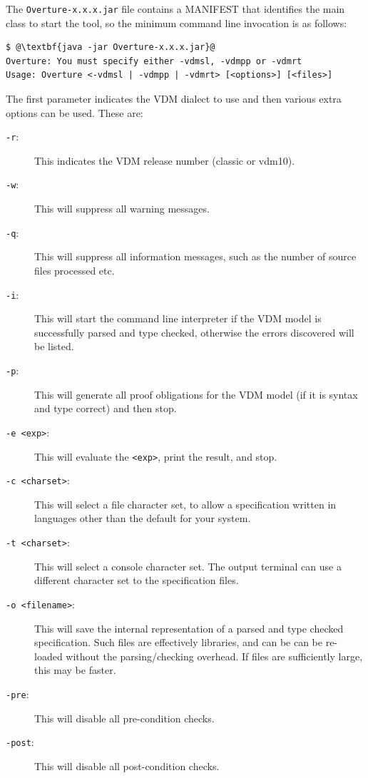 \documentclass{overturerepchap}
\begin{document}
The \texttt{Overture-x.x.x.jar} file contains a MANIFEST that identifies the main class to start the
tool, so the minimum command line invocation is as follows:

\lstset{style=tool,language=}
\begin{lstlisting}[escapechar=@]
$ @\textbf{java -jar Overture-x.x.x.jar}@
Overture: You must specify either -vdmsl, -vdmpp or -vdmrt
Usage: Overture <-vdmsl | -vdmpp | -vdmrt> [<options>] [<files>]
\end{lstlisting}
\lstset{style=mystyle}
\lstset{language=VDM++}

The first parameter indicates the VDM dialect to use and then
various extra options can be used. These are:

\begin{description}
\item[\texttt{-r}:] This indicates the VDM release number (classic or vdm10).
\item[\texttt{-w}:] This will suppress all warning messages.
\item[\texttt{-q}:] This will suppress all information messages, such as
 the number of source files processed etc.
\item[\texttt{-i}:] This will start the command line interpreter if the VDM
  model is successfully parsed and type checked, otherwise the errors discovered
  will be listed.
\item[\texttt{-p}:] This will generate all proof obligations for the
  VDM model (if it is syntax and type correct) and then stop.
\item[\texttt{-e <exp>}:] This will evaluate the \texttt{<exp>}, print
  the result, and stop.
\item[\texttt{-c <charset>}:] This will select a file character set, to
allow a specification written in languages other than the default for your system.
\item[\texttt{-t <charset>}:] This will select a console character set. The output
terminal can use a different character set to the specification files.
\item[\texttt{-o <filename>}:] This will save the internal
  representation of a parsed and type checked spe\-ci\-fication. Such files are
  effectively libraries, and can be can be re-loaded without the
  parsing/checking overhead. If files are sufficiently large, this may be faster.
\item[\texttt{-pre}:] This will disable all pre-condition checks.
\item[\texttt{-post}:] This will disable all post-condition checks.

\end{description}
\end{document}

